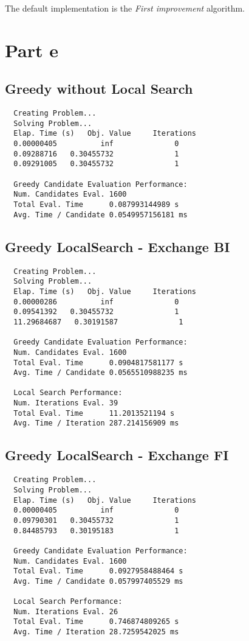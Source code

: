 \documentclass{article}
\begin{document}
The default implementation is the \emph{First improvement} algorithm.

\section{Part e}
\subsection{Greedy without Local Search}
\begin{lstlisting}
  Creating Problem...
  Solving Problem...
  Elap. Time (s)   Obj. Value     Iterations
  0.00000405          inf              0
  0.09288716   0.30455732              1
  0.09291005   0.30455732              1

  Greedy Candidate Evaluation Performance:
  Num. Candidates Eval. 1600
  Total Eval. Time      0.087993144989 s
  Avg. Time / Candidate 0.0549957156181 ms
\end{lstlisting}

\subsection{Greedy LocalSearch - Exchange BI}
\begin{lstlisting}
  Creating Problem...
  Solving Problem...
  Elap. Time (s)   Obj. Value     Iterations
  0.00000286          inf              0
  0.09541392   0.30455732              1
  11.29684687   0.30191587              1

  Greedy Candidate Evaluation Performance:
  Num. Candidates Eval. 1600
  Total Eval. Time      0.0904817581177 s
  Avg. Time / Candidate 0.0565510988235 ms

  Local Search Performance:
  Num. Iterations Eval. 39
  Total Eval. Time      11.2013521194 s
  Avg. Time / Iteration 287.214156909 ms
\end{lstlisting}

\subsection{Greedy LocalSearch - Exchange FI}
\begin{lstlisting}
  Creating Problem...
  Solving Problem...
  Elap. Time (s)   Obj. Value     Iterations
  0.00000405          inf              0
  0.09790301   0.30455732              1
  0.84485793   0.30195183              1

  Greedy Candidate Evaluation Performance:
  Num. Candidates Eval. 1600
  Total Eval. Time      0.0927958488464 s
  Avg. Time / Candidate 0.057997405529 ms

  Local Search Performance:
  Num. Iterations Eval. 26
  Total Eval. Time      0.746874809265 s
  Avg. Time / Iteration 28.7259542025 ms
\end{lstlisting}
\end{document}
